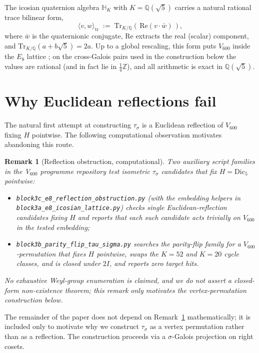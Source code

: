 \documentclass[11pt]{article}
\newtheorem{remark}{Remark}[section]
\newcommand{\twoI}{2I}
\newcommand{\Vsixhundred}{V_{600}}
\newcommand{\Dicfive}{\mathrm{Dic}_5}
\newcommand{\sigmaG}{\sigma}
\newcommand{\tausigma}{\tau_{\!\sigmaG}}
\begin{document}
The icosian quaternion algebra $\mathbb{H}_K$ with $K = \mathbb{Q}(\sqrt{5})$
carries a natural rational trace bilinear form,
\[
  \langle v, w \rangle_{\mathrm{tr}}
  \;:=\;
  \mathrm{Tr}_{K/\mathbb{Q}}\!\left(\,\mathrm{Re}(v \cdot \bar w)\,\right),
\]
where $\bar w$ is the quaternionic conjugate, $\mathrm{Re}$ extracts the
real (scalar) component, and $\mathrm{Tr}_{K/\mathbb{Q}}(a + b\sqrt{5}) = 2a$.
Up to a global rescaling, this form puts $\Vsixhundred$ inside the
$E_8$ lattice \citep{Elkies1995,ConwaySloane1988}; on the cross-Galois
pairs used in the construction below the values are rational (and in
fact lie in $\frac{1}{4}\mathbb{Z}$), and all arithmetic is exact in
$\mathbb{Q}(\sqrt{5})$.

\section{Why Euclidean reflections fail}\label{sec:reflfail}

The natural first attempt at constructing $\tausigma$ is a Euclidean
reflection of $\Vsixhundred$ fixing $H$ pointwise. The following
computational observation motivates abandoning this route.

\begin{remark}[Reflection obstruction, computational]\label{rem:reflfail}
Two auxiliary script families in the V$_{600}$ programme repository
test isometric $\tausigma$ candidates that fix $H = \Dicfive$
pointwise:
\begin{itemize}[leftmargin=2em]
\item \texttt{block3c\_e8\_reflection\_obstruction.py} (with the
embedding helpers in \texttt{block3a\_e8\_icosian\_lattice.py}) checks
single Euclidean-reflection candidates fixing $H$ and reports that
each such candidate acts trivially on $\Vsixhundred$ in the tested
embedding;
\item \texttt{block3b\_parity\_flip\_tau\_sigma.py} searches the
parity-flip family for a $\Vsixhundred$-permutation that fixes $H$
pointwise, swaps the $K=52$ and $K=20$ cycle classes, and is closed
under $\twoI$, and reports zero target hits.
\end{itemize}
No exhaustive Weyl-group enumeration is claimed, and we do not assert
a closed-form non-existence theorem; this remark only motivates the
vertex-permutation construction below.
\end{remark}

The remainder of the paper does not depend on Remark~\ref{rem:reflfail}
mathematically; it is included only to motivate why we construct
$\tausigma$ as a vertex permutation rather than as a reflection. The
construction proceeds via a $\sigmaG$-Galois projection on right
cosets.
\end{document}
